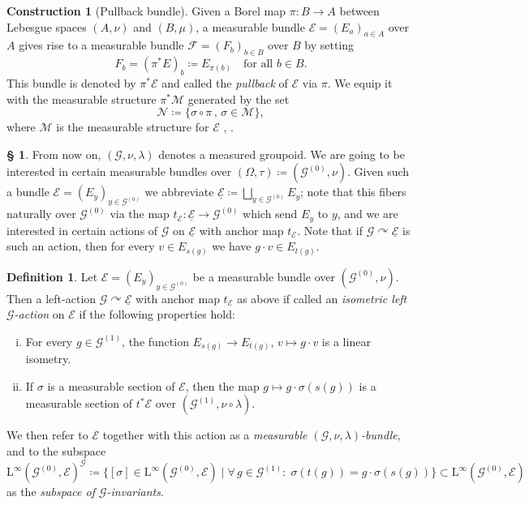 \documentclass[11pt, oneside]{amsart}
\theoremstyle{definition}
\newtheorem{defn}[lemma]{Definition}
\newtheorem{con}[lemma]{Construction}
\newtheorem{no}[lemma]{\S}
\theoremstyle{remark}
\theoremstyle{TheoremNum}
\newcommand\calM{{\mathcal M}}
\newcommand\calN{{\mathcal N}}
\newcommand\calG{{\mathcal G}}
\newcommand\calE{{\mathcal E}}
\newcommand{\cE}{\mathcal E}
\newcommand{\Linf}{\mathrm{L}^{\infty}}
\newcommand{\cG}{\mathcal{G}}
\begin{document}
  \begin{con}[Pullback bundle]
  Given a Borel map $\pi:B\rightarrow A$ between Lebesgue spaces $(A,\nu)$ and $(B,\mu)$, a measurable bundle $\calE=(E_a)_{a\in A}$ over $A$ gives rise to a measurable bundle $\mathcal{F}= (F_b)_{b \in B}$ over $B$ by setting
  \[
  F_b=(\pi^\ast E)_b\coloneqq E_{\pi(b)} \quad \text{for all }b \in B.
  \]
  This bundle is denoted by $\pi^*\calE$ and called the  \emph{pullback} of $\calE$ via $\pi$. We equip it with the measurable structure $\pi^*\calM$ generated by the set  
$$\calN\coloneqq \{ \sigma\circ \pi \,,\, \sigma\in \calM\},$$ where
$\calM$ is the measurable structure for $\calE$ \cite[Section 3]{sarti:savini25}, \cite{fell:doran}.
\end{con}
\begin{no}
 From now on,  $(\calG,\nu, \lambda)$ denotes a measured groupoid. We are going to be interested in certain measurable bundles over $(\Omega, \tau) \coloneqq (\cG^{(0)}, \nu)$. Given such a bundle $\cE = (E_y)_{y \in \cG^{(0)}}$ we abbreviate $\underline{\cE} \coloneqq \bigsqcup_{y \in \cG^{(0)}} E_y$; note that this fibers naturally over $\cG^{(0)}$ via the map $t_{\cE}: \underline{\cE} \to \cG^{(0)}$ which send $E_y$ to $y$, and we are interested in certain actions of $\cG$ on $\underline{\cE}$ with anchor map $t_{\cE}$. Note that if $\cG \curvearrowright \underline{\cE}$ is such an action, then for every $v \in E_{s(g)}$  we have $g \cdot v \in E_{t(g)}$.
 \end{no}
 \begin{defn} Let $\cE = (E_y)_{y \in \cG^{(0)}}$ be a measurable bundle over $(\cG^{(0)}, \nu)$. Then a left-action $\cG \curvearrowright \underline{\cE}$ with anchor map $t_{\cE}$ as above if called an
 \emph{isometric left $\calG$-action} on $\mathcal{E}$ if the following properties hold:
\begin{enumerate}[(i)]
\item For every $g\in \mathcal{G}^{(1)}$, the function 
$ E_{s(g)}\rightarrow E_{t(g)}$, $v \mapsto g\cdot v$ is a linear isometry.
\item If $\sigma$ is a measurable section of $\mathcal{E}$, then the map $g\mapsto g\cdot \sigma(s(g))$
is a measurable section of $t^*\calE$ over $(\calG^{(1)}, \nu \circ \lambda)$.
\end{enumerate}
We then refer to $\cE$ together with this action as a \emph{measurable $(\cG, \nu, \lambda)$-bundle}, and to the subspace
\[
\Linf(\cG^{(0)},\mathcal{E})^{\cG} \coloneqq \{[\sigma] \in \Linf(\cG^{(0)},\mathcal{E}) \mid \forall\, g \in \cG^{(1)}:\; \sigma(t(g))=g\cdot \sigma(s(g))\} \subset \Linf(\cG^{(0)},\mathcal{E})
\]
as the \emph{subspace of $\cG$-invariants}.
\end{defn}
\end{document}

